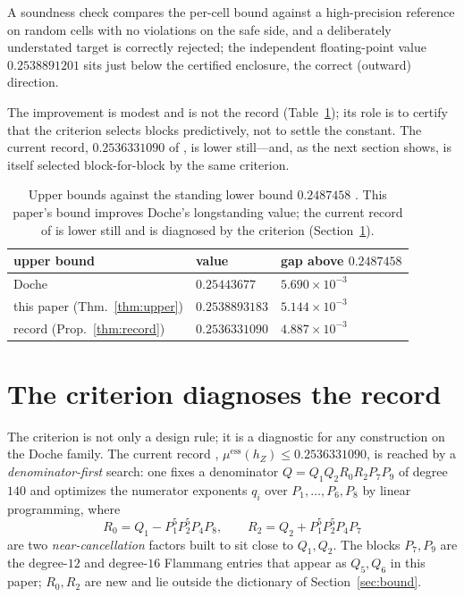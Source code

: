 \documentclass[11pt,reqno]{amsart}
\theoremstyle{plain}
\theoremstyle{definition}
\newcommand{\hZ}{h_Z}
\newcommand{\essmin}{\mu^{\mathrm{ess}}(\hZ)}
\begin{document}
A soundness check compares the per-cell bound against a high-precision reference on
random cells with no violations on the safe side, and a deliberately understated target
is correctly rejected; the independent floating-point value $0.2538891201$ sits just
below the certified enclosure, the correct (outward) direction.

The improvement is modest and is not the record (Table~\ref{tab:gap}); its role is to
certify that the criterion selects blocks predictively, not to settle the constant. The
current record, $0.2536331090$ of \citet{Gri26}, is lower still---and, as the next
section shows, is itself selected block-for-block by the same criterion.

\begin{table}[h]
\centering\small
\renewcommand{\arraystretch}{1.2}
\begin{tabular}{@{}lll@{}}
\toprule
upper bound & value & gap above $0.2487458$ \citep{F18}\\
\midrule
Doche \citep{Doc01b} & $0.25443677$ & $5.690\times10^{-3}$\\
this paper (Thm.~\ref{thm:upper}) & $0.2538893183$ & $5.144\times10^{-3}$\\
record \citep{Gri26} (Prop.~\ref{thm:record}) & $0.2536331090$ & $4.887\times10^{-3}$\\
\bottomrule
\end{tabular}
\medskip
\caption{Upper bounds against the standing lower bound $0.2487458$ \citep{F18}. This
paper's bound improves Doche's longstanding value; the current record of \citet{Gri26}
is lower still and is diagnosed by the criterion (Section~\ref{sec:record}).}
\label{tab:gap}
\end{table}

\section{The criterion diagnoses the record}\label{sec:record}

The criterion is not only a design rule; it is a diagnostic for any construction on the
Doche family. The current record \citep{Gri26},
$\essmin\le0.2536331090$, is reached by a \emph{denominator-first} search: one fixes a
denominator $Q=Q_1Q_2R_0R_2P_7P_9$ of degree $140$ and optimizes the numerator
exponents $q_i$ over $P_1,\dots,P_6,P_8$ by linear programming, where
\begin{equation}\label{eq:R0R2}
  R_0=Q_1-P_1^5P_2^5P_4P_8,\qquad R_2=Q_2+P_1^5P_2^5P_4P_7
\end{equation}
are two \emph{near-cancellation} factors built to sit close to $Q_1,Q_2$. The blocks
$P_7,P_9$ are the degree-$12$ and degree-$16$ Flammang entries that appear as $Q_5,Q_6$
in this paper; $R_0,R_2$ are new and lie outside the dictionary of
Section~\ref{sec:bound}.
\end{document}
